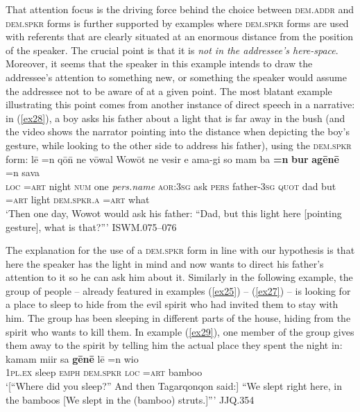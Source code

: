\documentclass[output=paper
,modfonts
,nonflat]{langsci/langscibook}
\begin{document}
\noindent
That attention focus is the driving force behind the choice between \textsc{dem.addr} and \textsc{dem.spkr} forms is further supported by examples where \textsc{dem.spkr}	forms are used with referents that are clearly situated at an enormous distance from the position of the speaker. The crucial point is that it is \emph{not in the addressee's here-space}. Moreover, it seems that the speaker in this example intends to draw the addressee's attention to something new, or something the speaker would assume the addressee not to be aware of at a given point. The most blatant example illustrating this point comes from another instance of direct speech in a narrative: in (\ref{ex28}), a boy asks his father about a light that is far away in the bush (and the video shows the narrator pointing into the distance when depicting the boy's gesture, while looking to the other side to address his father), using the \textsc{dem.spkr} form:
\ea	\label{ex28}
\gll	l\=e		=n 	q\=o\=n 	ne 	v\=owal 	Wow\=ot 		ne 		vesir 	e 		{\textquotesingle}ama-gi 		so			mam 	ba 	\textbf{=n} 		\textbf{bur} 	\textbf{ag\=en\=e}		=n 		sava		\\
\textsc{loc}	\textsc{=art}	night	\textsc{num}		one		\textit{pers.name}	\textsc{aor:3sg}	ask		\textsc{pers}	father-\textsc{3sg}	\textsc{quot}		dad		but		\textsc{=art}		light		\textsc{dem.spkr.a}	\textsc{=art}		what	\\
\glt	`Then one day, Wowot would ask his father: ``Dad, but this light here [pointing gesture], what is that?'''		\hfill{ISWM.075--076}
\z

\noindent
The explanation for the use of a \textsc{dem.spkr} form in line with our hypothesis is that here the speaker has the light in mind and now wants to direct his father's attention to it so he can ask him about it. Similarly in the following example, the group of people -- already featured in examples (\ref{ex25}) -- (\ref{ex27}) -- is looking for a place to sleep to hide from the evil spirit who had invited them to stay with him. The group has been sleeping in different parts of the house, hiding from the spirit who wants to kill them. In example (\ref{ex29}), one member of the group gives them away to the spirit by telling him the actual place they spent the night in:
\ea	\label{ex29}
\gll 	kamam 	mi{\textquotesingle}ir 	sa 		\textbf{g\=en\=e} 		l\=e		=n 		wio		\\
		\textsc{1pl.ex}	sleep	\textsc{emph}	\textsc{dem.spkr}	\textsc{loc}	\textsc{=art}	bamboo \\
\glt	`[``Where did you sleep?'' And then Tagarqonqon said:] ``We slept right here, in the bamboos [We slept in the (bamboo) struts.]'''			\hfill{JJQ.354}
\z
\end{document}
